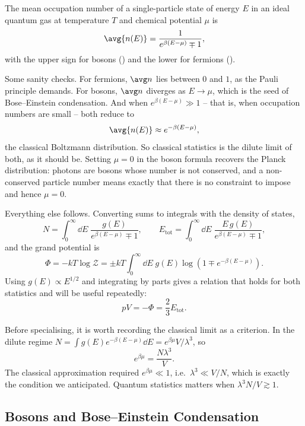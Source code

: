 \begin{proposition}
	The mean occupation number of a single-particle state of energy $E$ in an ideal quantum gas at temperature $T$ and chemical potential $\mu$ is
	$$
	\avg{n(E)} = \frac{1}{e^{\beta(E-\mu)}\mp 1},
	$$
	with the upper sign for bosons () and the lower for fermions ().
\end{proposition}

Some sanity checks. For fermions, $\avg n$ lies between $0$ and $1$, as the Pauli principle demands. For bosons, $\avg n$ diverges as $E \to \mu$, which is the seed of Bose--Einstein condensation. And when $e^{\beta(E-\mu)} \gg 1$ -- that is, when occupation numbers are small -- both reduce to
$$
\avg{n(E)} \approx e^{-\beta(E-\mu)},
$$
the classical Boltzmann distribution. So classical statistics is the dilute limit of both, as it should be. Setting $\mu = 0$ in the boson formula recovers the Planck distribution: photons are bosons whose number is not conserved, and a non-conserved particle number means exactly that there is no constraint to impose and hence $\mu = 0$.

Everything else follows. Converting sums to integrals with the density of states,
$$
N = \int_0^\infty \dd E\; \frac{g(E)}{e^{\beta(E-\mu)}\mp 1}, \qquad E_{\mathrm{tot}} = \int_0^\infty \dd E\; \frac{E\,g(E)}{e^{\beta(E-\mu)}\mp 1},
$$
and the grand potential is
$$
\Phi = -kT\log \mathcal Z = \pm kT \int_0^\infty \dd E\; g(E)\log\left(1 \mp e^{-\beta(E-\mu)}\right).
$$
Using $g(E) \propto E^{1/2}$ and integrating by parts gives a relation that holds for both statistics and will be useful repeatedly:
$$
pV = -\Phi = \frac 23 E_{\mathrm{tot}}.
$$

Before specialising, it is worth recording the classical limit as a criterion. In the dilute regime $N = \int g(E)e^{-\beta(E-\mu)}\dd E = e^{\beta\mu} V/\lambda^3$, so
$$
e^{\beta\mu} = \frac{N\lambda^3}{V}.
$$
The classical approximation required $e^{\beta\mu} \ll 1$, i.e.\ $\lambda^3 \ll V/N$, which is exactly the condition we anticipated. Quantum statistics matters when $\lambda^3 N/V \gtrsim 1$.

\subsection{Bosons and Bose--Einstein Condensation}\label{sec:bec}

